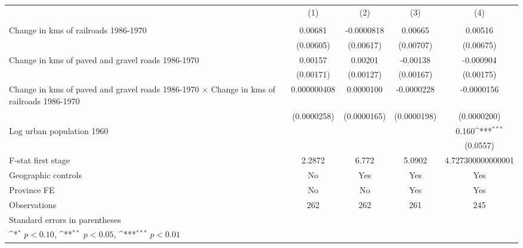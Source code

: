 {
\def\sym#1{\ifmmode^{#1}\else\(^{#1}\)\fi}
\begin{tabular}{l*{4}{c}}
\hline\hline
                &\multicolumn{1}{c}{(1)}&\multicolumn{1}{c}{(2)}&\multicolumn{1}{c}{(3)}&\multicolumn{1}{c}{(4)}\\
                &\multicolumn{1}{c}{}&\multicolumn{1}{c}{}&\multicolumn{1}{c}{}&\multicolumn{1}{c}{}\\
\hline
Change in kms of railroads 1986-1970&  0.00681         &-0.0000818         &  0.00665         &  0.00516         \\
                &(0.00605)         &(0.00617)         &(0.00707)         &(0.00675)         \\
[1em]
Change in kms of paved and gravel roads 1986-1970&  0.00157         &  0.00201         & -0.00138         &-0.000904         \\
                &(0.00171)         &(0.00127)         &(0.00167)         &(0.00175)         \\
[1em]
Change in kms of paved and gravel roads 1986-1970 $\times$ Change in kms of railroads 1986-1970&0.000000408         &0.0000100         &-0.0000228         &-0.0000156         \\
                &(0.0000258)         &(0.0000165)         &(0.0000198)         &(0.0000200)         \\
[1em]
Log urban population 1960&                  &                  &                  &    0.160\sym{***}\\
                &                  &                  &                  & (0.0557)         \\
\hline
F-stat first stage&   2.2872         &    6.772         &   5.0902         &4.727300000000001         \\
Geographic controls&       No         &      Yes         &      Yes         &      Yes         \\
Province FE     &       No         &       No         &      Yes         &      Yes         \\
Observations    &      262         &      262         &      261         &      245         \\
\hline\hline
\multicolumn{5}{l}{\footnotesize Standard errors in parentheses}\\
\multicolumn{5}{l}{\footnotesize \sym{*} \(p<0.10\), \sym{**} \(p<0.05\), \sym{***} \(p<0.01\)}\\
\end{tabular}
}
